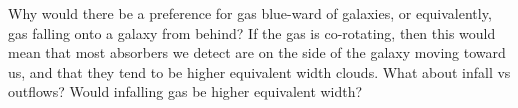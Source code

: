 \documentclass[iop]{emulateapj-rtx4}
\begin{document}
Why would there be a preference for gas blue-ward of galaxies, or equivalently, gas falling onto a galaxy from behind? If the gas is co-rotating, then this would mean that most absorbers we detect are on the side of the galaxy moving toward us, and that they tend to be higher equivalent width clouds. What about infall vs outflows? Would infalling gas be higher equivalent width?



%
%
%
%
%
%
%
%
%
\end{document}
